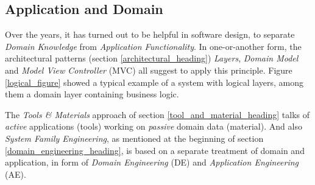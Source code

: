 %
%
%
%
%
%
%

\subsection{Application and Domain}
\label{application_and_domain_heading}

Over the years, it has turned out to be helpful in software design, to separate
\emph{Domain Knowledge} from \emph{Application Functionality}. In one-or-another
form, the architectural patterns (section \ref{architectural_heading})
\emph{Layers}, \emph{Domain Model} and \emph{Model View Controller} (MVC) all
suggest to apply this principle. Figure \ref{logical_figure} showed a typical
example of a system with logical layers, among them a domain layer containing
business logic.

The \emph{Tools \& Materials} approach of section \ref{tool_and_material_heading}
talks of \emph{active} applications (tools) working on \emph{passive} domain
data (material). And also \emph{System Family Engineering}, as mentioned at the
beginning of section \ref{domain_engineering_heading}, is based on a separate
treatment of domain and application, in form of \emph{Domain Engineering} (DE)
and \emph{Application Engineering} (AE).

